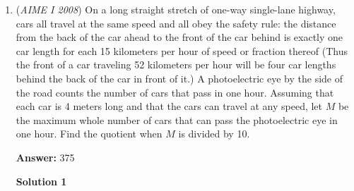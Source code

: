 \begin{enumerate}
 



\textbf{Solution 3}

There must be an even amount of runs of consecutive $B$s due to parity. Thus, we can split this sequence into the following cases: $A$, $BAAB$, $AABAAB$, $BAABAA$, $AABAABAA$, $BAABAABAAB$, $AABAABAABAAB$, $BAABAABAABAA$, and $AABAABAABAABAA$, in which the amount of letters in one run does not necessarily represent the amount of letters there can be.

 For the first case and the last case, there is only one possible sequence of letters.

 For all other cases, we can insert two of the same letter at a time into a run that has the exact same letter. For example, for the second case, we can insert two $A$s and make the sequence $BAAAAB$. There are three "slots" in which we can insert two additional letters in, and we must insert five groups of new letters. By \href{https://artofproblemsolving.com/wiki/index.php?title=Stars\_and\_bars}{stars and bars}, the number of ways for the second case is $\binom{7}{2}=21$.

 Applying this logic to all of the other cases gives us $\binom{7}{3}$, $\binom{7}{3}$, $\binom{7}{4}$, $\binom{8}{6}$, $\binom{8}{1}$, and $\binom{8}{1}$. Adding 1+$\binom{7}{2}$+$\binom{7}{3}$+$\binom{7}{3}$+$\binom{7}{4}$+$\binom{8}{6}$+$\binom{8}{1}$+$\binom{8}{1}$ gives us the answer $\boxed{172}$.

 


	\item (\textit{AIME I 2008}) On a long straight stretch of one-way single-lane highway, cars all travel at the same speed and all obey the safety rule: the distance from the back of the car ahead to the front of the car behind is exactly one car length for each 15 kilometers per hour of speed or fraction thereof (Thus the front of a car traveling 52 kilometers per hour will be four car lengths behind the back of the car in front of it.) A photoelectric eye by the side of the road counts the number of cars that pass in one hour. Assuming that each car is 4 meters long and that the cars can travel at any speed, let $M$ be the maximum whole number of cars that can pass the photoelectric eye in one hour. Find the quotient when $M$ is divided by 10.


 
 \textbf{Answer: }375



\textbf{Solution 1}


\end{enumerate}
